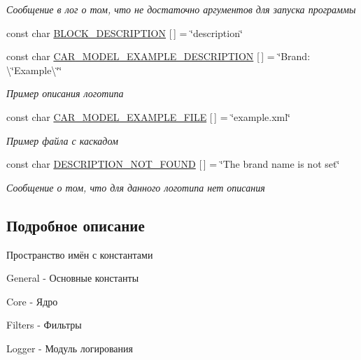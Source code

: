 \begin{DoxyCompactItemize}
\begin{DoxyCompactList}\small\item\em Сообщение в лог о том, что не достаточно аргументов для запуска программы \end{DoxyCompactList}\item 
const char \mbox{\hyperlink{namespaceyenot_abc55bd8e208d61e4d5055b305d998624}{B\+L\+O\+C\+K\+\_\+\+D\+E\+S\+C\+R\+I\+P\+T\+I\+ON}} \mbox{[}$\,$\mbox{]} = \char`\"{}description\char`\"{}
\item 
const char \mbox{\hyperlink{namespaceyenot_a15f1fcc1f696f7e59aaf534d28eeebb9}{C\+A\+R\+\_\+\+M\+O\+D\+E\+L\+\_\+\+E\+X\+A\+M\+P\+L\+E\+\_\+\+D\+E\+S\+C\+R\+I\+P\+T\+I\+ON}} \mbox{[}$\,$\mbox{]} = \char`\"{}Brand\+: \textbackslash{}\char`\"{}Example\textbackslash{}\char`\"{}\char`\"{}
\begin{DoxyCompactList}\small\item\em Пример описания логотипа \end{DoxyCompactList}\item 
const char \mbox{\hyperlink{namespaceyenot_ad659efb70fd572b82d45f7ec0d9e7ff3}{C\+A\+R\+\_\+\+M\+O\+D\+E\+L\+\_\+\+E\+X\+A\+M\+P\+L\+E\+\_\+\+F\+I\+LE}} \mbox{[}$\,$\mbox{]} = \char`\"{}example.\+xml\char`\"{}
\begin{DoxyCompactList}\small\item\em Пример файла с каскадом \end{DoxyCompactList}\item 
const char \mbox{\hyperlink{namespaceyenot_abc01a4ee833e7c083cba257351b21769}{D\+E\+S\+C\+R\+I\+P\+T\+I\+O\+N\+\_\+\+N\+O\+T\+\_\+\+F\+O\+U\+ND}} \mbox{[}$\,$\mbox{]} = \char`\"{}The brand name is not set\char`\"{}
\begin{DoxyCompactList}\small\item\em Сообщение о том, что для данного логотипа нет описания \end{DoxyCompactList}\end{DoxyCompactItemize}


\subsection{Подробное описание}
Пространство имён с константами 

General -\/ Основные константы

Core -\/ Ядро

Filters -\/ Фильтры

Logger -\/ Модуль логирования

